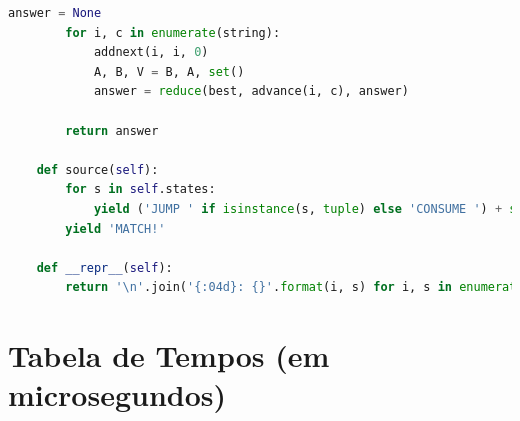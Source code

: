 \documentclass[a4paper,12pt,oneside,onecolumn]{uerj}
\begin{document}
\begin{lstlisting}[language=python]
        answer = None
        for i, c in enumerate(string):
            addnext(i, i, 0)
            A, B, V = B, A, set()
            answer = reduce(best, advance(i, c), answer)           

        return answer
       
    def source(self):
        for s in self.states:
            yield ('JUMP ' if isinstance(s, tuple) else 'CONSUME ') + str(s)
        yield 'MATCH!'
       
    def __repr__(self):
        return '\n'.join('{:04d}: {}'.format(i, s) for i, s in enumerate(self.source()))
\end{lstlisting}   


\section{Tabela de Tempos (em microsegundos)}
\end{document}

